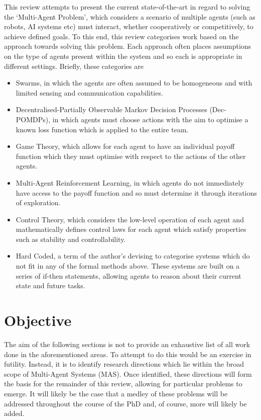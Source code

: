 \documentclass[../sample.tex]{subfiles}
\begin{document}
This review attempts to present the current state-of-the-art in regard to solving the ‘Multi-Agent
Problem’, which considers a scenario of multiple agents (such as robots, AI systems etc) must
interact, whether cooperatively or competitively, to achieve defined goals. To this end, this review
categorises work based on the approach towards solving this problem. Each approach often places
assumptions on the type of agents present within the system and so each is appropriate in different
settings. Briefly, these categories are

\begin{itemize} 
\item Swarms, in which the agents are often assumed to be homogeneous and with limited sensing and
communication capabilities. 

\item Decentralised-Partially Observable Markov Decision Processes (Dec-POMDPs), in which agents
must choose actions with the aim to optimise a known loss function which is applied to the entire
team. 

\item Game Theory, which allows for each agent to have an individual payoff function which they
must optimise with respect to the actions of the other agents.  

\item Multi-Agent Reinforcement Learning, in which agents do not immediately have access to the
payoff function and so must determine it through iterations of exploration. 
	
\item Control Theory, which considers the low-level operation of each agent and mathematically
defines control laws for each agent which satisfy properties such as stability and controllability.

	\item Hard Coded, a term of the author’s devising to categorise systems which do not fit in any of
the formal methods above. These systems are built on a series of if-then statements, allowing agents
to reason about their current state and future tasks. 

\end{itemize}

\section{Objective}

The aim of the following sections is not to provide an exhaustive list of all work done in the
aforementioned areas. To attempt to do this would be an exercise in futility. Instead, it is to
identify research directions which lie within the broad scope of Multi-Agent Systems (MAS).  Once
identified, these directions will form the basis for the remainder of this review, allowing for
particular problems to emerge. It will likely be the case that a medley of these problems will be
addressed throughout the course of the PhD and, of course, more will likely be added. 
\end{document}
